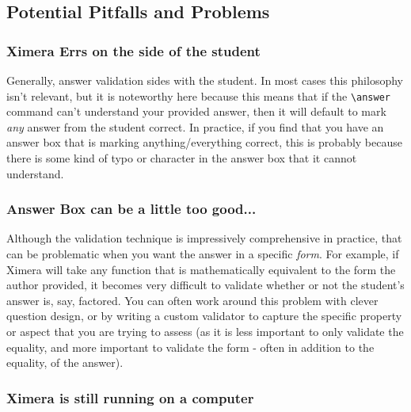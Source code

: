 \documentclass{ximera}
\begin{document}
\subsection*{Potential Pitfalls and Problems}

\subsubsection*{Ximera Errs on the side of the student}

Generally, answer validation sides with the student. In most cases this
philosophy isn't relevant, but it is noteworthy here because this means that if
the \verb|\answer| command can't understand your provided answer, then it will
default to mark \textit{any} answer from the student correct. In practice, if
you find that you have an answer box that is marking anything/everything
correct, this is probably because there is some kind of typo or character in
the answer box that it cannot understand.

\subsubsection*{Answer Box can be a little too good...}

Although the validation technique is impressively comprehensive in
practice, that can be problematic when you want the answer in a specific
\textit{form}. For example, if Ximera will take any function that is
mathematically equivalent to the form the author provided, it becomes very
difficult to validate whether or not the student's answer is, say, factored.
You can often work around this problem with clever question design, or by
writing a custom validator to capture the specific property or aspect that you
are trying to assess (as it is less important to only validate the equality,
and more important to validate the form - often in addition to the equality, of
the answer).

\subsubsection*{Ximera is still running on a computer}
\end{document}
